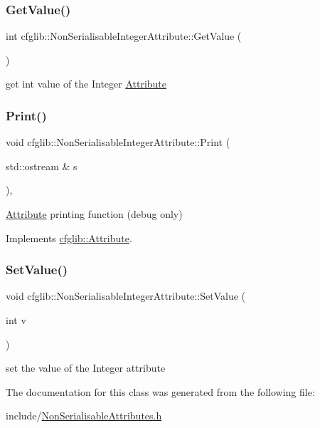 \subsubsection{\texorpdfstring{Get\+Value()}{GetValue()}}
{\footnotesize\ttfamily int cfglib\+::\+Non\+Serialisable\+Integer\+Attribute\+::\+Get\+Value (\begin{DoxyParamCaption}{ }\end{DoxyParamCaption})\hspace{0.3cm}{\ttfamily [inline]}}

get int value of the Integer \hyperlink{classcfglib_1_1Attribute}{Attribute} \mbox{\label{classcfglib_1_1NonSerialisableIntegerAttribute_ade6c5738723b606295a2cf14fe568247}} 
\subsubsection{\texorpdfstring{Print()}{Print()}}
{\footnotesize\ttfamily void cfglib\+::\+Non\+Serialisable\+Integer\+Attribute\+::\+Print (\begin{DoxyParamCaption}\item[{std\+::ostream \&}]{s }\end{DoxyParamCaption})\hspace{0.3cm}{\ttfamily [inline]}, {\ttfamily [virtual]}}

\hyperlink{classcfglib_1_1Attribute}{Attribute} printing function (debug only) 

Implements \hyperlink{classcfglib_1_1Attribute_af8d87ceddde146b92727e61823e0129b}{cfglib\+::\+Attribute}.

\mbox{\label{classcfglib_1_1NonSerialisableIntegerAttribute_a7bff73325941157e314046c31f266d2a}} 
\subsubsection{\texorpdfstring{Set\+Value()}{SetValue()}}
{\footnotesize\ttfamily void cfglib\+::\+Non\+Serialisable\+Integer\+Attribute\+::\+Set\+Value (\begin{DoxyParamCaption}\item[{int}]{v }\end{DoxyParamCaption})\hspace{0.3cm}{\ttfamily [inline]}}

set the value of the Integer attribute 

The documentation for this class was generated from the following file\+:\begin{DoxyCompactItemize}
\item 
include/\hyperlink{NonSerialisableAttributes_8h}{Non\+Serialisable\+Attributes.\+h}\end{DoxyCompactItemize}
